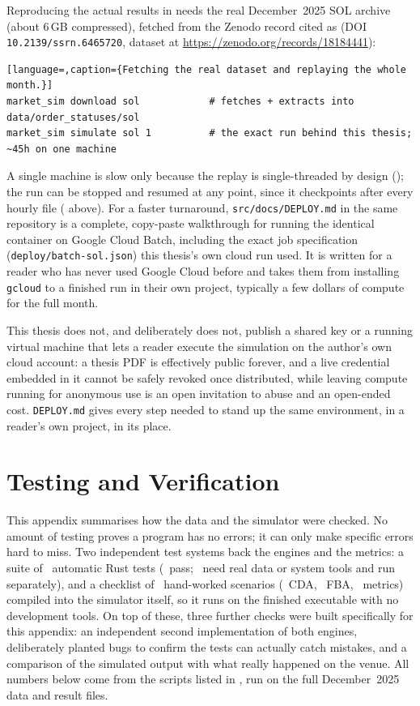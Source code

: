 Reproducing the actual results in  needs the real December~2025
SOL archive (about 6\,GB compressed), fetched from the Zenodo record cited as
\citet{albers2026openbook} (DOI \texttt{10.2139/ssrn.6465720}, dataset at
\url{https://zenodo.org/records/18184441}):

\begin{lstlisting}[language=,caption={Fetching the real dataset and replaying the whole month.}]
market_sim download sol            # fetches + extracts into data/order_statuses/sol
market_sim simulate sol 1          # the exact run behind this thesis; ~45h on one machine
\end{lstlisting}

A single machine is slow only because the replay is single-threaded by design
(); the run can be stopped and resumed at any point, since
it checkpoints after every hourly file ( above). For a faster
turnaround, \texttt{src/docs/DEPLOY.md} in the same repository is a complete,
copy-paste walkthrough for running the identical container on Google Cloud
Batch, including the exact job specification (\texttt{deploy/batch-sol.json})
this thesis's own cloud run used. It is written for a reader who has never used
Google Cloud before and takes them from installing \texttt{gcloud} to a finished
run in their own project, typically a few dollars of compute for the full month.

This thesis does not, and deliberately does not, publish a shared key or a
running virtual machine that lets a reader execute the simulation on the
author's own cloud account: a thesis PDF is effectively public forever, and a
live credential embedded in it cannot be safely revoked once distributed, while
leaving compute running for anonymous use is an open invitation to abuse and an
open-ended cost. \texttt{DEPLOY.md} gives every step needed to stand up the same
environment, in a reader's own project, in its place.

\chapter{Testing and Verification}
\label{app:testing}

This appendix summarises how the data and the simulator were checked. No amount of
testing proves a program has no errors; it can only make specific errors hard to
miss. Two independent test systems back the engines and the metrics: a suite of
\VerTestsTotal\ automatic Rust tests (\VerTestsPassed\ pass; \VerTestsIgnored\ need
real data or system tools and run separately), and a checklist of
\VerChecklistTotal\ hand-worked scenarios (\VerChecklistCda\ CDA, \VerChecklistFba\
FBA, \VerChecklistMet\ metrics) compiled into the simulator itself, so it runs on the
finished executable with no development tools. On top of these, three further checks
were built specifically for this appendix: an independent second implementation of
both engines, deliberately planted bugs to confirm the tests can actually catch
mistakes, and a comparison of the simulated output with what really happened on the
venue. All numbers below come from the scripts listed in \Cref{sec:testlimits}, run
on the full December~2025 data and result files.

